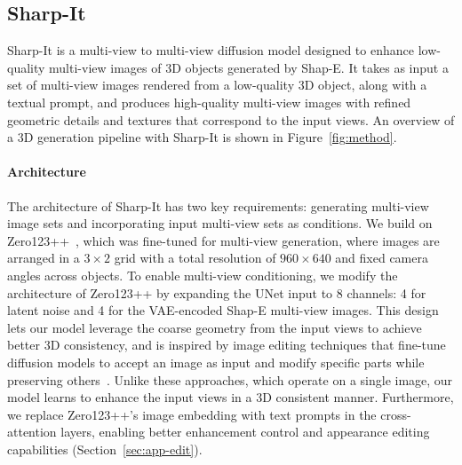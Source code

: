 \subsection{Sharp-It}
Sharp-It is a multi-view to multi-view diffusion model designed to enhance low-quality multi-view images of 3D objects generated by Shap-E. It takes as input a set of multi-view images rendered from a low-quality 3D object, along with a textual prompt, and produces high-quality multi-view images with refined geometric details and textures that correspond to the input views.
An overview of a 3D generation pipeline with Sharp-It is shown in Figure~\ref{fig:method}.

\paragraph{Architecture}
The architecture of Sharp-It has two key requirements: generating multi-view image sets and incorporating input multi-view sets as conditions. We build on Zero123++~\cite{shi2023zero123singleimageconsistent, xu2024instantmesh}, which was fine-tuned for multi-view generation, where images are arranged in a $3\times2$ grid with a total resolution of $960\times640$ and fixed camera angles across objects.
%
To enable multi-view conditioning, we modify the architecture of Zero123++ by expanding the UNet input to 8 channels: 4 for latent noise and 4 for the VAE-encoded Shap-E multi-view images. This design lets our model leverage the coarse geometry from the input views to achieve better 3D consistency, and is inspired by image editing techniques that fine-tune diffusion models to accept an image as input and modify specific parts while preserving others~\cite{brooks2022instructpix2pix, rombach2022highresolutionimagesynthesislatent, yang2022paint}. Unlike these approaches, which operate on a single image, our model learns to enhance the input views in a 3D consistent manner. 
Furthermore, we replace Zero123++'s image embedding with text prompts in the cross-attention layers, enabling better enhancement control and appearance editing capabilities (Section~\ref{sec:app-edit}).


